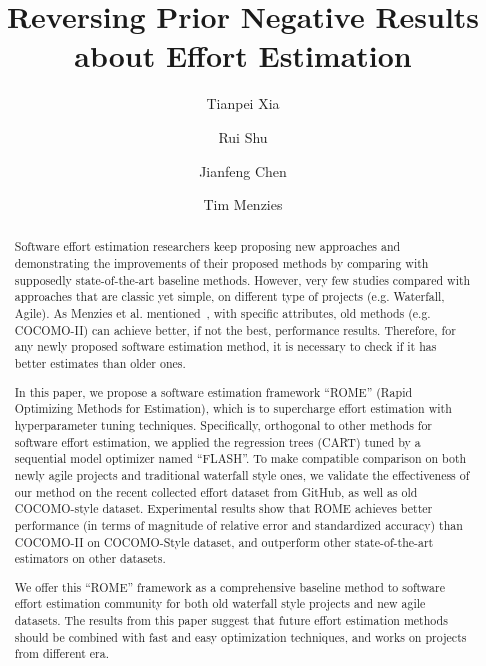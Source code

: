 \documentclass[sigconf,review,anonymous]{acmart}
\begin{document}
\title{Reversing Prior Negative Results about Effort Estimation}

\author{Tianpei Xia}

\author{Rui Shu}

\author{Jianfeng Chen}

\author{Tim Menzies}

\renewcommand{\shortauthors}{Xia et al.}
\renewcommand{\textrightarrow}{$\rightarrow$}


\begin{abstract}
Software effort estimation researchers keep proposing new approaches and  demonstrating the improvements of their proposed methods by comparing with supposedly state-of-the-art baseline methods. However, very few studies compared with approaches that are classic yet simple, on different type of projects (e.g. Waterfall, Agile). As Menzies et al. mentioned~\cite{MenziesNeg:2017}, with specific attributes, old methods (e.g. COCOMO-II) can achieve better, if not the best, performance results. Therefore, for any newly proposed software estimation method, it is necessary to check if it has better estimates than older ones.
 
In this paper, we propose a software estimation framework ``ROME'' (Rapid Optimizing Methods for Estimation), which is to supercharge effort estimation with hyperparameter tuning techniques. Specifically, orthogonal to other methods for software effort estimation, we applied the regression trees (CART) tuned by a sequential model optimizer named ``FLASH''. To make compatible comparison on both newly agile projects and traditional waterfall style ones, we validate the effectiveness of our method on the recent collected effort dataset from GitHub, as well as old COCOMO-style dataset. Experimental results show that ROME achieves better performance (in terms of magnitude of relative error and standardized accuracy) than COCOMO-II on COCOMO-Style dataset, and outperform other state-of-the-art estimators on other datasets. 

We offer this ``ROME'' framework as a comprehensive baseline method to software effort estimation community for both old waterfall style projects and new agile datasets. The results from this paper suggest that future effort estimation methods should be combined with fast and easy optimization techniques, and works on projects from different era.
\end{abstract}
\end{document}
